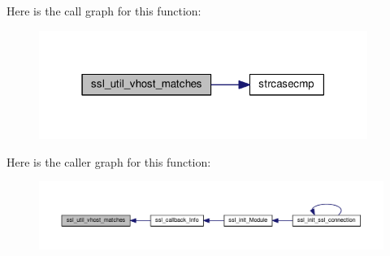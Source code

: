 Here is the call graph for this function\+:
\nopagebreak
\begin{figure}[H]
\begin{center}
\leavevmode
\includegraphics[width=303pt]{group__MOD__SSL__PRIVATE_ga677f0129945882342653cb3037ee9314_cgraph}
\end{center}
\end{figure}




Here is the caller graph for this function\+:
\nopagebreak
\begin{figure}[H]
\begin{center}
\leavevmode
\includegraphics[width=350pt]{group__MOD__SSL__PRIVATE_ga677f0129945882342653cb3037ee9314_icgraph}
\end{center}
\end{figure}


